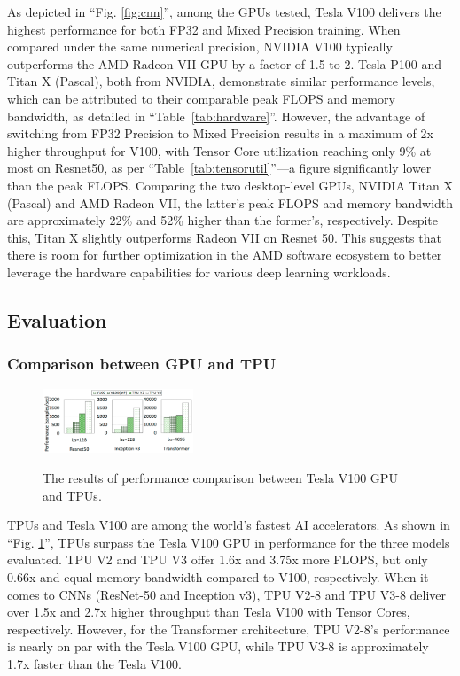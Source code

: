 As depicted in ``Fig. \ref{fig:cnn}'', among the GPUs tested, Tesla V100 delivers the highest performance for both FP32 and Mixed Precision training.
When compared under the same numerical precision, NVIDIA V100 typically outperforms the AMD Radeon VII GPU by a factor of 1.5 to 2.
Tesla P100 and Titan X (Pascal), both from NVIDIA, demonstrate similar performance levels, which can be attributed to their comparable peak FLOPS and memory bandwidth, as detailed in ``Table~\ref{tab:hardware}''.
However,
the advantage of switching from FP32 Precision to Mixed Precision results in a maximum of 2x higher throughput for V100,
with Tensor Core utilization reaching only 9\% at most on Resnet50,
as per ``Table~\ref{tab:tensorutil}''—a figure significantly lower than the peak FLOPS\@.
Comparing the two desktop-level GPUs, NVIDIA Titan X (Pascal) and AMD Radeon VII,
the latter's peak FLOPS and memory bandwidth are approximately 22\% and 52\% higher than the former's, respectively.
Despite this, Titan X slightly outperforms Radeon VII on Resnet 50.
This suggests that there is room for further optimization in the AMD software ecosystem to better leverage the hardware capabilities for various deep learning workloads.

\subsection{Evaluation}
\label{subsec:evaluation}

\subsubsection{Comparison between GPU and TPU}

\begin{figure}[htbp!]
    \centering
    {    \includegraphics[width=0.4\textwidth]{images/tpugpucomp}}
    \caption{The results of performance comparison between Tesla V100 GPU and TPUs.}
    \label{fig:tpugpucomp}
\end{figure}

TPUs and Tesla V100 are among the world's fastest AI accelerators.
As shown in ``Fig. \ref{fig:tpugpucomp}'', TPUs surpass the Tesla V100 GPU in performance for the three models evaluated.
TPU V2 and TPU V3 offer 1.6x and 3.75x more FLOPS, but only 0.66x and equal memory bandwidth compared to V100, respectively.
When it comes to CNNs (ResNet-50 and Inception v3), TPU V2-8 and TPU V3-8 deliver over 1.5x and 2.7x higher throughput than Tesla V100 with Tensor Cores, respectively.
However, for the Transformer architecture, TPU V2-8's performance is nearly on par with the Tesla V100 GPU, while TPU V3-8 is approximately 1.7x faster than the Tesla V100.

